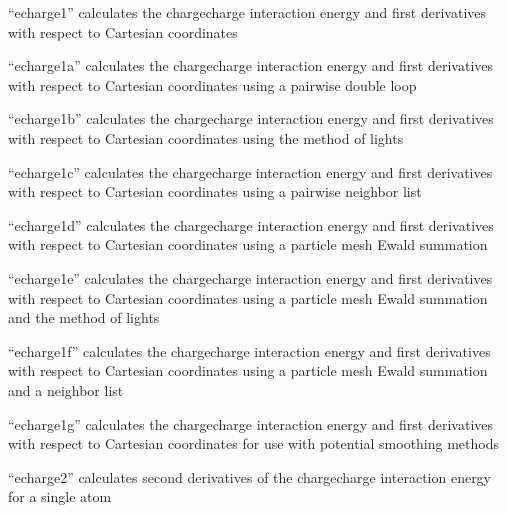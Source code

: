 \documentclass[letterpaper,11pt,english]{sphinxmanual}
\begin{document}

“echarge1” calculates the charge\sphinxhyphen{}charge interaction energy
and first derivatives with respect to Cartesian coordinates


“echarge1a” calculates the charge\sphinxhyphen{}charge interaction energy
and first derivatives with respect to Cartesian coordinates
using a pairwise double loop


“echarge1b” calculates the charge\sphinxhyphen{}charge interaction energy
and first derivatives with respect to Cartesian coordinates
using the method of lights


“echarge1c” calculates the charge\sphinxhyphen{}charge interaction energy
and first derivatives with respect to Cartesian coordinates
using a pairwise neighbor list


“echarge1d” calculates the charge\sphinxhyphen{}charge interaction energy
and first derivatives with respect to Cartesian coordinates
using a particle mesh Ewald summation


“echarge1e” calculates the charge\sphinxhyphen{}charge interaction energy
and first derivatives with respect to Cartesian coordinates
using a particle mesh Ewald summation and the method of lights


“echarge1f” calculates the charge\sphinxhyphen{}charge interaction energy
and first derivatives with respect to Cartesian coordinates
using a particle mesh Ewald summation and a neighbor list


“echarge1g” calculates the charge\sphinxhyphen{}charge interaction energy
and first derivatives with respect to Cartesian coordinates
for use with potential smoothing methods


“echarge2” calculates second derivatives of the
charge\sphinxhyphen{}charge interaction energy for a single atom

\end{document}
